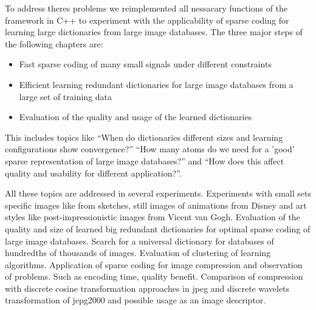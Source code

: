 To address theres problems we reimplemented all nessacary functions of the
framework in C++ to experiment with the applicability of sparse coding for
learning large dictionaries from large image databases. The three major steps of
the following chapters are:

\begin{itemize}
 \item Fast sparse coding of many small signals under different constraints
 \item Efficient learning redundant dictionaries for large image databases from a large set of training data
 \item Evaluation of the quality and usage of the learned dictionaries
\end{itemize}

This includes topics like ``When do dictionaries different sizes and
learning configurations show convergence?'' ``How many atoms do we need  for a
'good' sparse representation of large image databases?''  and ``How does this
affect quality and usability for different application?''. 

All these topics are addressed in several experiments. Experiments with
small sets specific images like from sketches, still images of animations from
Disney and art styles like post-impressionistic images from Vicent van Gogh.
Evaluation of the quality and size of learned big redundant dictionaries for
optimal sparse coding of large image databases. Search for a universal
dictionary for databases of hundredths of thousands of images. Evaluation of
clustering of learning algorithms. Application of sparse coding for image
compression and observation of problems. Such as encoding time, quality benefit.
Comparison of compression with discrete cosine transformation approaches in jpeg
and discrete wavelets transformation of jepg2000 and possible usage as an image
descriptor.







